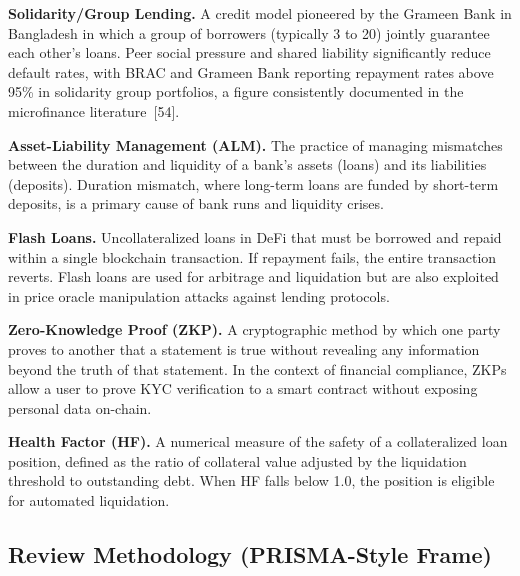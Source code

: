 \documentclass[12pt,a4paper]{report}
\begin{document}
\hangindent=0.5in \textbf{Solidarity/Group Lending.} A credit model pioneered by the Grameen Bank in Bangladesh in which a group of borrowers (typically 3 to 20) jointly guarantee each other's loans. Peer social pressure and shared liability significantly reduce default rates, with BRAC and Grameen Bank reporting repayment rates above 95\% in solidarity group portfolios, a figure consistently documented in the microfinance literature~[54].

\hangindent=0.5in \textbf{Asset-Liability Management (ALM).} The practice of managing mismatches between the duration and liquidity of a bank's assets (loans) and its liabilities (deposits). Duration mismatch, where long-term loans are funded by short-term deposits, is a primary cause of bank runs and liquidity crises.

\hangindent=0.5in \textbf{Flash Loans.} Uncollateralized loans in DeFi that must be borrowed and repaid within a single blockchain transaction. If repayment fails, the entire transaction reverts. Flash loans are used for arbitrage and liquidation but are also exploited in price oracle manipulation attacks against lending protocols.

\hangindent=0.5in \textbf{Zero-Knowledge Proof (ZKP).} A cryptographic method by which one party proves to another that a statement is true without revealing any information beyond the truth of that statement. In the context of financial compliance, ZKPs allow a user to prove KYC verification to a smart contract without exposing personal data on-chain.

\hangindent=0.5in \textbf{Health Factor (HF).} A numerical measure of the safety of a collateralized loan position, defined as the ratio of collateral value adjusted by the liquidation threshold to outstanding debt. When HF falls below 1.0, the position is eligible for automated liquidation.

\subsection{Review Methodology (PRISMA-Style Frame)}
\label{sec:lit-prisma}
\end{document}
